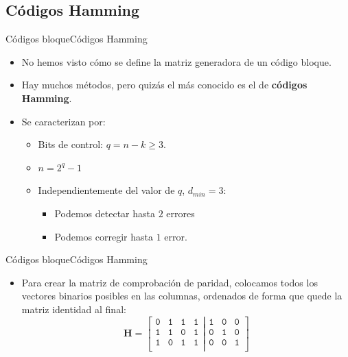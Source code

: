 \documentclass[10pt,compress]{beamer} %
\begin{document}
\subsection{Códigos Hamming}
\begin{frame}{Códigos bloque}{Códigos Hamming}
  \begin{itemize}
    \item No hemos visto cómo se define la matriz generadora de un código bloque.
    \item Hay muchos métodos, pero quizás el más conocido es el de {\bf códigos Hamming}.
    \item Se caracterizan por:
    \begin{itemize}
      \item Bits de control: $q = n - k \geq 3$.
      \item $n= 2^q - 1$
      \item Independientemente del valor de $q$, $d_{min}=3$:
      \begin{itemize}
        \item Podemos detectar hasta $2$ errores
        \item Podemos corregir hasta $1$ error.
      \end{itemize}
    \end{itemize}
  \end{itemize}
\end{frame}


\begin{frame}{Códigos bloque}{Códigos Hamming}
  \begin{itemize}
    \item Para crear la matriz de comprobación de paridad, colocamos todos los vectores binarios posibles en las columnas, ordenados de forma que quede la matriz identidad al final:
    \begin{displaymath}
      \mathbf{H} = \left [ \begin{array}{cccc}
      \mathtt{0} & \mathtt{1} & \mathtt{1} & \mathtt{1}\\
      \mathtt{1} & \mathtt{1} & \mathtt{0} & \mathtt{1}\\
      \mathtt{1} & \mathtt{0} & \mathtt{1} & \mathtt{1}\\ 	
     \end{array}
     \left |
      \begin{array}{ccc}
      \mathtt{1} & \mathtt{0} & \mathtt{0} \\
      \mathtt{0} & \mathtt{1} & \mathtt{0} \\
      \mathtt{0} & \mathtt{0} & \mathtt{1} \\
     \end{array}
     \right.
      \right ]
    \end{displaymath}
  \end{itemize}
\end{frame}
\end{document}
